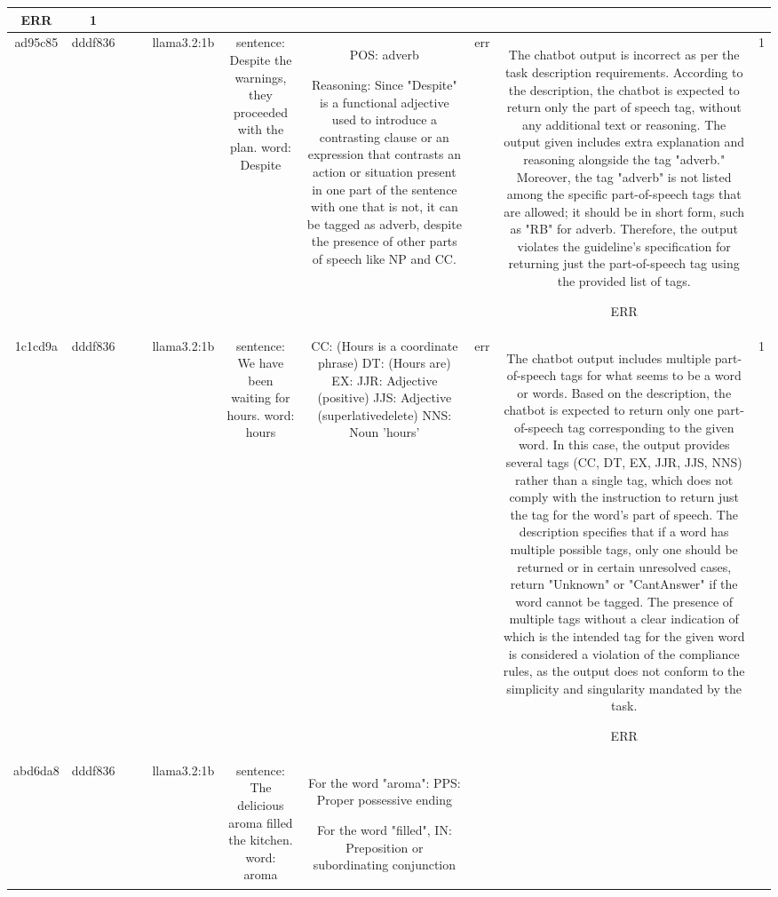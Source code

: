 \begin{table}[h!]
\begin{tabular}{|c|c|c|c|c|c|c|c|c|c|}
ERR & 1\\
\hline
ad95c85 & dddf836 &  &  & llama3.2:1b & sentence: Despite the warnings, they proceeded with the plan. word: Despite & POS: adverb

Reasoning:
Since "Despite" is a functional adjective used to introduce a contrasting clause or an expression that contrasts an action or situation present in one part of the sentence with one that is not, it can be tagged as adverb, despite the presence of other parts of speech like NP and CC. & err & The chatbot output is incorrect as per the task description requirements. According to the description, the chatbot is expected to return only the part of speech tag, without any additional text or reasoning. The output given includes extra explanation and reasoning alongside the tag "adverb." Moreover, the tag "adverb" is not listed among the specific part-of-speech tags that are allowed; it should be in short form, such as "RB" for adverb. Therefore, the output violates the guideline's specification for returning just the part-of-speech tag using the provided list of tags.

ERR & 1\\
\hline
1c1cd9a & dddf836 &  &  & llama3.2:1b & sentence: We have been waiting for hours. word: hours & CC: (Hours is a coordinate phrase)
DT: (Hours are)
EX: 
JJR: Adjective (positive)
JJS: Adjective (superlativedelete) 
NNS: Noun 'hours' & err & The chatbot output includes multiple part-of-speech tags for what seems to be a word or words. Based on the description, the chatbot is expected to return only one part-of-speech tag corresponding to the given word. In this case, the output provides several tags (CC, DT, EX, JJR, JJS, NNS) rather than a single tag, which does not comply with the instruction to return just the tag for the word's part of speech. The description specifies that if a word has multiple possible tags, only one should be returned or in certain unresolved cases, return "Unknown" or "CantAnswer" if the word cannot be tagged. The presence of multiple tags without a clear indication of which is the intended tag for the given word is considered a violation of the compliance rules, as the output does not conform to the simplicity and singularity mandated by the task.

ERR & 1\\
\hline
abd6da8 & dddf836 &  &  & llama3.2:1b & sentence: The delicious aroma filled the kitchen. word: aroma & For the word "aroma":
PPS: Proper possessive ending

For the word "filled", 
IN: Preposition or subordinating conjunction
 

\end{tabular}
\end{table}
